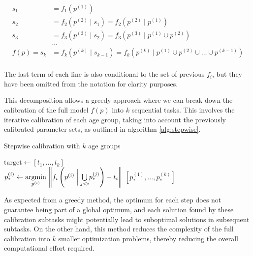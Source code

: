 \documentclass[sn-mathphys,Numbered]{sn-jnl}%
\begin{document}
\begin{equation} \label{eq:stepwise-function}
	\begin{aligned}
		s_1 &= f_1(p^{(1)})  \\
		s_2 &= f_2(p^{(2)} \mid s_1)= f_2(p^{(2)} \mid p^{(1)}) \\
		s_3 &= f_3(p^{(3)} \mid s_2)= f_3(p^{(3)} \mid p^{(1)} \cup p^{(2)}) \\
		&\dots \\
		f(p) = s_k &= f_k(p^{(k)} \mid s_{k-1})= f_k(p^{(k)} \mid p^{(1)} \cup p^{(2)} \cup \dots \cup p^{(k-1)}) \\
	\end{aligned}
\end{equation}	

The last term of each line is also conditional to the set of previous $f_i$, but they have been omitted from the notation for clarity purposes.

This decomposition allows a greedy approach where we can break down the calibration of the full model $f(p)$ into $k$ sequential tasks. This involves the iterative calibration of each age group, taking into account the previously calibrated parameter sets, as outlined in algorithm \ref{alg:stepwise}.

\begin{algorithm}[h!]
	\caption{Stepwise calibration with $k$ age groups}\label{alg:stepwise}
	\begin{algorithmic}
		\Require $\mathrm{target} \gets [t_1, \dots, t_k]$
		 \\
		\State $p_*^{(i)} \gets \underset{p^{(i)}}{\mathrm{argmin}}\, \left\lVert f_i\left(p^{(i)} \hspace{0.25em} \bigg| \hspace{0.25em} \underset{j < i}{\bigcup} p_*^{(j)} \right) -  t_i \right\lVert$
		\EndFor
		\State \Return $[p_*^{(1)}, \dots, p_*^{(k)}]$
	\end{algorithmic}
\end{algorithm}

As expected from a greedy method, the optimum for each step does not guarantee being part of a global optimum, and each solution found by these calibration subtasks might potentially lead to suboptimal solutions in subsequent subtasks. On the other hand, this method reduces the complexity of the full calibration into $k$ smaller optimization problems, thereby reducing the overall computational effort required.
\end{document}
